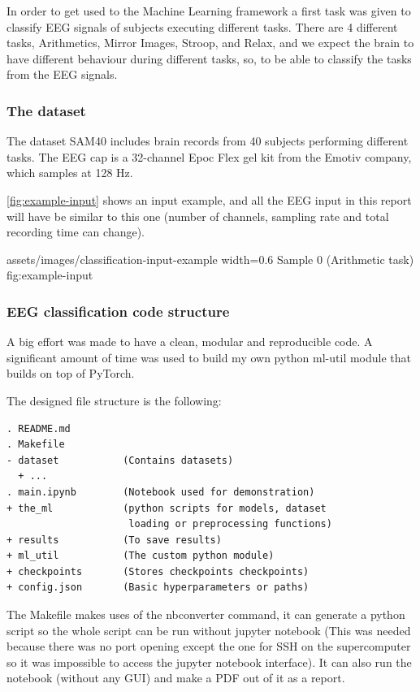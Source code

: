 In order to get used to the Machine Learning framework a first task was given to
classify EEG signals of subjects executing different tasks. There are 4
different tasks, Arithmetics, Mirror Images, Stroop, and Relax, and we expect
the brain to have different behaviour during different tasks, so, to be able to
classify the tasks from the EEG signals.

\subsubsection{The dataset}

The dataset SAM40\cite{Ghosh2022} includes brain records from 40 subjects
performing different tasks. The EEG cap is a 32-channel Epoc Flex gel kit from
the Emotiv company, which samples at 128 Hz.

\cref{fig:example-input} shows an input example, and all the EEG input in this
report will have be similar to this one (number of channels, sampling rate and
total recording time can change).

\insertfigure
    {assets/images/classification-input-example}
    {width=0.6\textwidth}
    {Sample 0 (Arithmetic task)}
    {fig:example-input}

\subsubsection{EEG classification code structure}

A big effort was made to have a clean, modular and reproducible code.  A
significant amount of time was used to build my own python ml-util module that
builds on top of PyTorch.

The designed file structure is the following:
\begin{verbatim}
. README.md
. Makefile
- dataset           (Contains datasets)
  + ...
. main.ipynb        (Notebook used for demonstration)
+ the_ml            (python scripts for models, dataset 
                     loading or preprocessing functions)
+ results           (To save results)
+ ml_util           (The custom python module)
+ checkpoints       (Stores checkpoints checkpoints)
+ config.json       (Basic hyperparameters or paths)
\end{verbatim}

The Makefile makes uses of the nbconverter command, it can generate a python
script so the whole script can be run without jupyter notebook (This was needed
because there was no port opening except the one for SSH on the supercomputer so
it was impossible to access the jupyter notebook interface).  It can also run
the notebook (without any GUI) and make a PDF out of it as a report.

